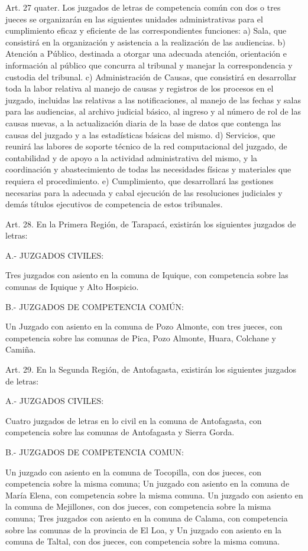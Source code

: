     Art. 27 quater. Los juzgados de letras de competencia común con dos o tres jueces se organizarán en las siguientes unidades administrativas para el cumplimiento eficaz y eficiente de las correspondientes funciones:
    a) Sala, que consistirá en la organización y asistencia a la realización de las audiencias.
    b) Atención a Público, destinada a otorgar una adecuada atención, orientación e información al público que concurra al tribunal y manejar la correspondencia y custodia del tribunal.
    c) Administración de Causas, que consistirá en desarrollar toda la labor relativa al manejo de causas y registros de los procesos en el juzgado, incluidas las relativas a las notificaciones, al manejo de las fechas y salas para las audiencias, al archivo judicial básico, al ingreso y al número de rol de las causas nuevas, a la actualización diaria de la base de datos que contenga las causas del juzgado y a las estadísticas básicas del mismo.
    d) Servicios, que reunirá las labores de soporte técnico de la red computacional del juzgado, de contabilidad y de apoyo a la actividad administrativa del mismo, y la coordinación y abastecimiento de todas las necesidades físicas y materiales que requiera el procedimiento.
    e) Cumplimiento, que desarrollará las gestiones necesarias para la adecuada y cabal ejecución de las resoluciones judiciales y demás títulos ejecutivos de competencia de estos tribunales.

    Art. 28. En la Primera Región, de Tarapacá, existirán los siguientes juzgados de letras:

    A.- JUZGADOS CIVILES:

    Tres juzgados con asiento en la comuna de Iquique, con competencia sobre las comunas de Iquique y Alto Hospicio.

    B.- JUZGADOS DE COMPETENCIA COMÚN:

    Un Juzgado con asiento en la comuna de Pozo Almonte, con tres jueces, con competencia sobre las comunas de Pica, Pozo Almonte, Huara, Colchane y Camiña.


    Art. 29. En la Segunda Región, de Antofagasta, existirán los siguientes juzgados de letras:

    A.- JUZGADOS CIVILES:

    Cuatro juzgados de letras en lo civil en la comuna de Antofagasta, con competencia sobre las comunas de Antofagasta y Sierra Gorda.

    B.- JUZGADOS DE COMPETENCIA COMUN:

    Un juzgado con asiento en la comuna de Tocopilla, con dos jueces, con competencia sobre la misma comuna;
    Un juzgado con asiento en la comuna de María Elena, con competencia sobre la misma comuna. Un juzgado con asiento en la comuna de Mejillones, con dos jueces, con competencia sobre la misma comuna;
    Tres juzgados con asiento en la comuna de Calama, con competencia sobre las comunas de la provincia de El Loa, y
    Un juzgado con asiento en la comuna de Taltal, con dos jueces, con competencia sobre la misma comuna.



